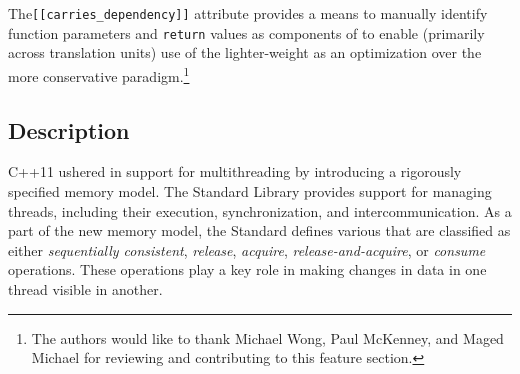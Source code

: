 

\label{the-carries_dependency-attribute}
\setcounter{table}{0}
\setcounter{footnote}{0}
\setcounter{lstlisting}{0}

The\lstinline![[carries_dependency]]! attribute provides a means to
manually identify function parameters and \lstinline!return! values as
components of  to enable (primarily 
across translation units) use of the lighter-weight
  as an
optimization over the more conservative 
paradigm.{\cprotect\footnote{The authors would like to thank Michael
Wong, Paul McKenney, and Maged Michael for reviewing and contributing to this feature section.}}

\subsection[Description]{Description}\label{description}

C++11 ushered in support for multithreading by introducing a rigorously
specified memory model. The Standard Library provides support for
managing threads, including their execution, synchronization, and
intercommunication. As a part of the new memory model, the Standard
defines various  that are classified as either \emph{sequentially
consistent}, \emph{release}, \emph{acquire}, 
\emph{release-and-acquire}, or \emph{consume} operations. These
operations play a key role in making changes in data in one thread
visible in another.

